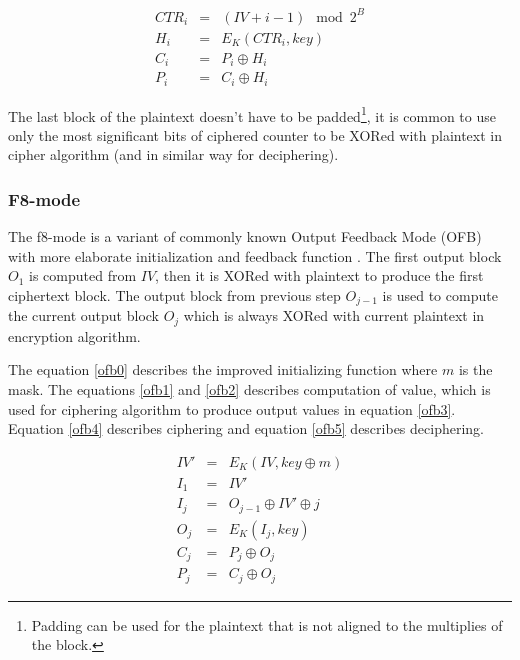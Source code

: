 \begin{eqnarray}
\label{ctr1}
CTR_i &=& (IV + i-1)\mod 2^B \\
\label{ctr2}
H_i &=& E_K(CTR_i, key) \\
\label{ctr3}
C_i &=& P_i \oplus H_i \\
\label{ctr4}
P_i &=& C_i \oplus H_i
\end{eqnarray} 

The last block of the plaintext doesn't have to be padded\footnote{ Padding 
can be used for the plaintext that is not aligned to the multiplies of the 
block.}, it is common to use only the most significant bits of ciphered counter
to be XORed with plaintext in cipher algorithm (and in similar way for
deciphering). 


\subsubsection*{F8-mode}
The f8-mode is a variant of commonly known Output Feedback Mode (OFB)
\cite{blockciphers} with more elaborate initialization and feedback function
\cite{rfc3711}. The first output block $O_1$ is computed from $IV$, then it
is XORed with plaintext to produce the first ciphertext block. The output block
from previous step $O_{j-1}$ is used to compute the current output block $O_j$
which is always XORed with current plaintext in encryption algorithm. 

The equation \ref{ofb0} describes the improved initializing function where
$m$ is the mask. The equations \ref{ofb1} and \ref{ofb2} describes computation 
of value, which is used for ciphering algorithm to produce output values in 
equation \ref{ofb3}. Equation \ref{ofb4} describes ciphering and equation 
\ref{ofb5} describes deciphering.

\begin{eqnarray}
\label{ofb0}
IV' &=& E_K(IV, key \oplus m)\\
\label{ofb1}
I_1 &=& IV' \\
\label{ofb2}
I_j &=& O_{j-1} \oplus IV' \oplus j \\
\label{ofb3}
O_j &=& E_K(I_j, key) \\
\label{ofb4}
C_j &=& P_j \oplus O_j \\
\label{ofb5}
P_j &=& C_j \oplus O_j
\label{}
\end{eqnarray}






